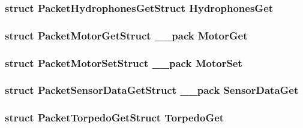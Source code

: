 \subsubsection[{Hydrophones\+Get}]{\setlength{\rightskip}{0pt plus 5cm}struct {\bf Packet\+Hydrophones\+Get\+Struct} Hydrophones\+Get}\label{union_packet_union_a4d04f6e9b20e542b2d759220c2a8dc2e}
\hypertarget{union_packet_union_a7495b8796840522d1935d7342a5d462f}{}
\subsubsection[{Motor\+Get}]{\setlength{\rightskip}{0pt plus 5cm}struct {\bf Packet\+Motor\+Get\+Struct} \+\_\+\+\_\+pack Motor\+Get}\label{union_packet_union_a7495b8796840522d1935d7342a5d462f}
\hypertarget{union_packet_union_a956769d4d38d30395db4f058d7b4ca83}{}
\subsubsection[{Motor\+Set}]{\setlength{\rightskip}{0pt plus 5cm}struct {\bf Packet\+Motor\+Set\+Struct} \+\_\+\+\_\+pack Motor\+Set}\label{union_packet_union_a956769d4d38d30395db4f058d7b4ca83}
\hypertarget{union_packet_union_ac7fce93edd24cbfb6cf107541c41973f}{}
\subsubsection[{Sensor\+Data\+Get}]{\setlength{\rightskip}{0pt plus 5cm}struct {\bf Packet\+Sensor\+Data\+Get\+Struct} \+\_\+\+\_\+pack Sensor\+Data\+Get}\label{union_packet_union_ac7fce93edd24cbfb6cf107541c41973f}
\hypertarget{union_packet_union_a584ce65208b2639e8c739b5c2a5bee6b}{}
\subsubsection[{Torpedo\+Get}]{\setlength{\rightskip}{0pt plus 5cm}struct {\bf Packet\+Torpedo\+Get\+Struct} Torpedo\+Get}\label{union_packet_union_a584ce65208b2639e8c739b5c2a5bee6b}
\hypertarget{union_packet_union_a4152a82cdb15d94a2cd3835c3c543019}{}
